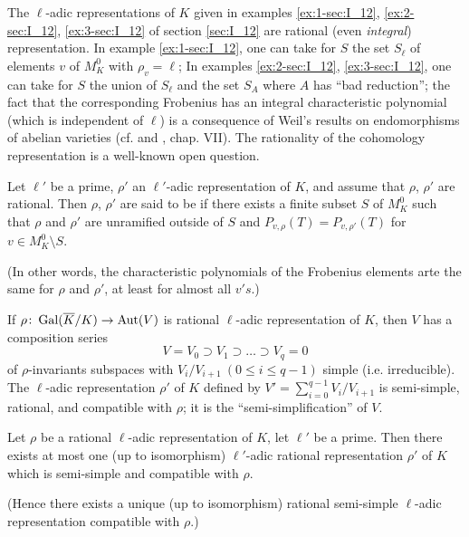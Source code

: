 \begin{ex}
The $\ell$-adic representations of $K$ given in examples \ref{ex:1-sec:I_12},
\ref{ex:2-sec:I_12}, \ref{ex:3-sec:I_12} of section \ref{sec:I_12} are rational
(even \emph{integral}) representation.
In example \ref{ex:1-sec:I_12}, one can take for $S$ the set $S_{\ell}$ of
elements $v$ of $M_K^0$ with $\rho_v = \ell$; In examples \ref{ex:2-sec:I_12},
\ref{ex:3-sec:I_12}, one can take for $S$ the union of $S_\ell$ and the set
$S_A$ where $A$ has ``bad reduction''; the fact that the corresponding
Frobenius has an integral characteristic polynomial (which is independent of
$\ell$) is a consequence of Weil's results on endomorphisms of abelian
varieties (cf. \cite{40} and \cite{12}, chap. VII).
\dpage
The rationality of the cohomology representation is a well-known open question.
\end{ex}

\begin{mydef}
Let $\ell'$ be a prime, $\rho'$ an $\ell'$-adic representation of $K$, and assume that $\rho$, $\rho'$ are rational. Then $\rho$, $\rho'$ are said to be  if there exists a finite subset $S$ of $M_K^0$ such that $\rho$ and $\rho'$ are unramified outside of $S$ and $P_{v,\rho}(T) = P_{v,\rho'}(T)$ for $v \in M_K^0 \setminus S$.
\end{mydef}

(In other words, the characteristic polynomials of the Frobenius elements arte the same for $\rho$ and $\rho'$, at least for almost all $v's$.)

If $\rho\colon \operatorname{Gal}(\overline{K}/K) \to \operatorname{Aut}(V)$ is rational $\ell$-adic representation of $K$, then $V$ has a composition series
\[
	V = V_0 \supset V_1 \supset \hdots \supset V_q = 0
\]
of $\rho$-invariants subspaces with $V_i / V_{i+1} ~ (0 \leq i \leq q - 1)$ simple (i.e. irreducible). The $\ell$-adic representation $\rho'$ of $K$ defined by $V' = \sum_{i=0}^{q-1} V_i / V_{i + 1}$ is semi-simple, rational, and compatible with $\rho$; it is the ``semi-simplification'' of $V$. 

\begin{thm}
Let $\rho$ be a rational $\ell$-adic representation of $K$, let $\ell'$ be a prime. Then there exists at most one (up to isomorphism) $\ell'$-adic rational representation $\rho'$ of $K$ which is semi-simple and compatible with $\rho$.
\end{thm}

(Hence there exists a unique (up to isomorphism) rational semi-simple $\ell$-adic representation compatible with $\rho$.)

